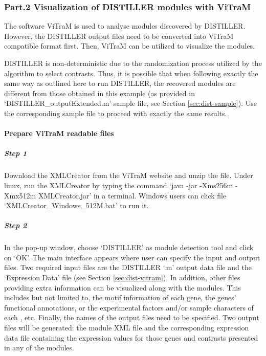 \subsubsection{Part.2 Visualization of DISTILLER modules with ViTraM}
The software ViTraM is used to analyse modules discovered by DISTILLER.
However, the DISTILLER output files need to be converted into ViTraM
compatible format first.  Then, ViTraM can be utilized to visualize the
modules.

DISTILLER is non-deterministic due to the randomization process utilized by
the algorithm to select contrasts.
%
Thus, it is possible that when following exactly the same way as outlined here
to run DISTILLER, the recovered modules are different from those obtained in
this example (as provided in `DISTILLER\_outputExtended.m' sample file, see
Section \ref{sec:dist-sample}).  Use the corresponding sample file to proceed
with exactly the same results.


\paragraph{Prepare ViTraM readable files}

\begin{small} %
\subparagraph{Step 1} Download the XMLCreator from the ViTraM 
website\cite{ViTraM} and unzip the file. Under linux, run the
XMLCreator by typing the command `java -jar -Xms256m -Xmx512m
XMLCreator.jar' in a terminal.  Windows users can click file
`XMLCreator\_Windows\_512M.bat' to run it.

\subparagraph{Step 2} In the pop-up window, choose `DISTILLER' as module 
detection tool and click on `OK'.  
%
The main interface appears where user can specify the input and output
files.
%
Two required input files are the DISTILLER `.m' output data file and
the `Expression Data' file (see Section \ref{sec:dist-vitram}).  In
addition, other files providing extra information can be visualized
along with the modules. This includes but not limited to, the motif
information of each gene, the genes' functional annotations, or the
experimental factors and/or sample characters of each , etc.
%
Finally, the names of the output files need to be specified. Two
output files will be generated: the module XML file and the
corresponding expression data file containing the expression values
for those genes and contrasts presented in any of the modules.


\end{small} %

